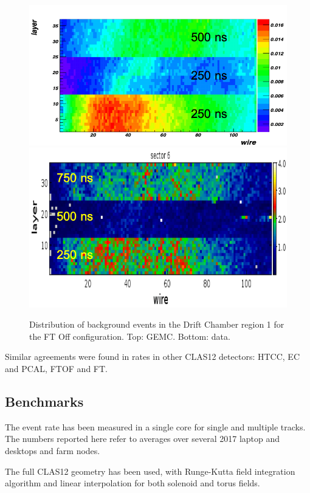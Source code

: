 \begin{figure}
	\centering
	\includegraphics[width=0.95\columnwidth,keepaspectratio]{img/ftOffGemcDCRates.png}
	\includegraphics[width=0.95\columnwidth,keepaspectratio]{img/ftOffDataDCRates.png}
	\caption{Distribution of background events in the Drift Chamber region 1 for the FT Off configuration.
             Top: GEMC. Bottom: data.}
	\label{fig:ftOffComparison}
\end{figure}

Similar agreements were found in rates in other CLAS12 detectors: HTCC, EC and PCAL, FTOF and FT.

\subsection{Benchmarks}

The event rate has been measured in a single core for single and multiple tracks. The numbers reported here
refer to averages over several 2017 laptop and desktops and farm nodes.

The full CLAS12 geometry has been used, with Runge-Kutta field integration algorithm
and linear interpolation for both solenoid and torus fields.

